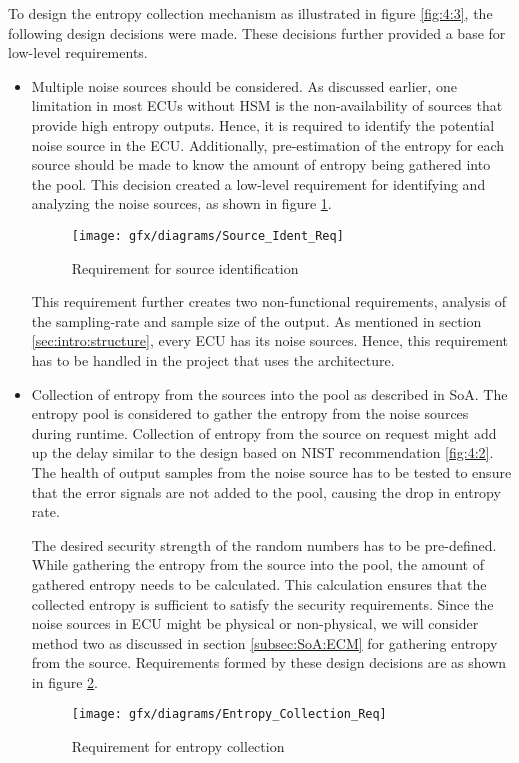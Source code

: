 To design the entropy collection mechanism as illustrated in figure \ref{fig:4:3}, the following design decisions were made. These decisions further provided a base for low-level requirements.
\begin{itemize}
	\item Multiple noise sources should be considered. As discussed earlier, one limitation in most ECUs without HSM is the non-availability of sources that provide high entropy outputs. Hence, it is required to identify the potential noise source in the ECU. Additionally, pre-estimation of the entropy for each source should be made to know the amount of entropy being gathered into the pool. This decision created a low-level requirement for identifying and analyzing the noise sources, as shown in figure \ref{fig:4:4}.
	\begin{figure}[!h]
		\centering
		\texttt{[image: gfx/diagrams/Source\_Ident\_Req]}
		\caption{Requirement for source identification}
		\label{fig:4:4}
	\end{figure}

	This requirement further creates two non-functional requirements, analysis of the sampling-rate and sample size of the output. As mentioned in section \ref{sec:intro:structure}, every ECU has its noise sources. Hence, this requirement has to be handled in the project that uses the architecture.
	
	\item Collection of entropy from the sources into the pool as described in SoA. The entropy pool is considered to gather the entropy from the noise sources during runtime. Collection of entropy from the source on request might add up the delay similar to the design based on NIST recommendation \ref{fig:4:2}. The health of output samples from the noise source has to be tested to ensure that the error signals are not added to the pool, causing the drop in entropy rate. 
	
	The desired security strength of the random numbers has to be pre-defined. While gathering the entropy from the source into the pool, the amount of gathered entropy needs to be calculated. This calculation ensures that the collected entropy is sufficient to satisfy the security requirements. Since the noise sources in ECU might be physical or non-physical, we will consider method two as discussed in section \ref{subsec:SoA:ECM} for gathering entropy from the source. Requirements formed by these design decisions are as shown in figure \ref{fig:4:5}.
	\begin{figure}[!h]
		\centering
		\texttt{[image: gfx/diagrams/Entropy\_Collection\_Req]}
		\caption{Requirement for entropy collection}
		\label{fig:4:5}
	\end{figure}


\end{itemize}
